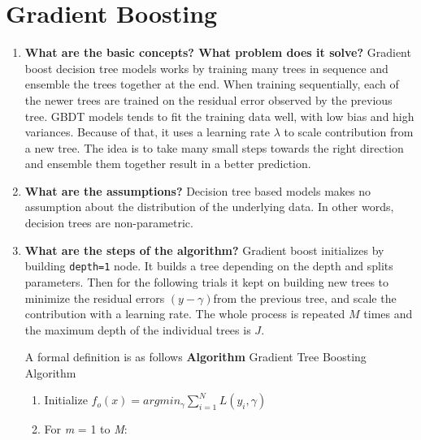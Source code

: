 \documentclass{article}
\begin{document}
\section{Gradient Boosting}
\noindent
\begin{enumerate}
    \item \textbf{What are the basic concepts? What problem does it solve?}
    \noindent 
    \smallbreak
    Gradient boost decision tree models works by training many trees in sequence and ensemble the trees together at the end. When training sequentially, each of the newer trees are trained on the residual error observed by the previous tree. GBDT models tends to fit the training data well, with low bias and high variances. Because of that, it uses a learning rate $\lambda$ to scale contribution from a new tree. The idea is to take many small steps towards the right direction and ensemble them together result in a better prediction.

    \item \textbf{What are the assumptions?}
    \noindent 
    \smallbreak
    Decision tree based models makes no assumption about the distribution of the underlying data. In other words, decision trees are non-parametric.
    
    \item \textbf{What are the steps of the algorithm?}
    \noindent 
    \smallbreak
    Gradient boost initializes by building \verb|depth=1| node. It builds a tree depending on the depth and splits parameters. Then for the following trials it kept on building new trees to minimize the residual errors $(y - \gamma)$from the previous tree, and scale the contribution with a learning rate. The whole process is repeated $M$ times and the maximum depth of the individual trees is $J$.
    
    A formal definition is as follows \cite{1}
    \bigbreak
    \hline
    \noindent
    \textbf{Algorithm} Gradient Tree Boosting Algorithm
    \begin{enumerate}
    \hline
        \item Initialize $f_o(x) = argmin_{\gamma} \sum_{i=1}^{N} L(y_i, \gamma)$
        \item For \emph{m} = 1 to \emph{M}:
            \begin{enumerate}
                

\end{enumerate}
\end{enumerate}
\end{enumerate}
\end{document}
